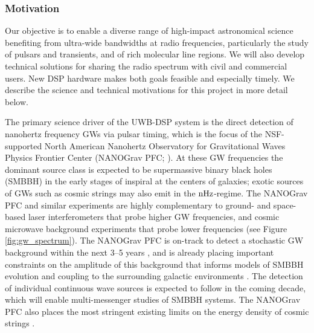 \documentclass[10pt]{myNSF}
\begin{document}
\subsubsection{Motivation}
\label{sec:motivation}

Our objective is to enable a diverse range of high-impact astronomical
science benefiting from ultra-wide bandwidths at radio frequencies,
particularly the study of pulsars and transients, and of rich
molecular line regions.  We will also develop technical solutions for
sharing the radio spectrum with civil and commercial users.  New DSP
hardware makes both goals feasible and especially timely.  We describe
the science and technical motivations for this project in more detail
below.

\label{sec:science_motivation}

 The primary science driver
of the UWB-DSP system is the direct detection of nanohertz frequency
GWs via pulsar timing, which is the focus of the NSF-supported North
American Nanohertz Observatory for Gravitational Waves Physics
Frontier Center (NANOGrav PFC; \cite{mcl13}).  At these GW frequencies
the dominant source class is expected to be supermassive binary black
holes (SMBBH) in the early stages of inspiral at the centers of
galaxies; exotic sources of GWs such as cosmic strings may also emit
in the $\textrm{nHz}$-regime.  The NANOGrav PFC and similar experiments are
highly complementary to ground- and space-based laser interferometers
that probe higher GW frequencies, and cosmic microwave background
experiments that probe lower frequencies (see Figure
\ref{fig:gw_spectrum}).  The NANOGrav PFC is on-track to detect a
stochastic GW background within the next 3--5 years \citep{tve+15},
and is already placing important constraints on the amplitude of this
background that informs models of SMBBH evolution and coupling to the
surrounding galactic environments \citep{abb+16,abb+18}.  The
detection of individual continuous wave sources is expected to follow
in the coming decade, which will enable multi-messenger studies of
SMBBH systems.  The NANOGrav PFC also places the most stringent
existing limits on the energy density of cosmic strings
\citep{abb+18}.
\end{document}
